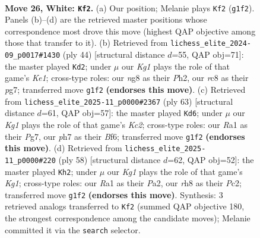\documentclass[11pt]{article}
\begin{document}
\clearpage

\begin{figure}[p]\centering
\begin{subfigure}{0.46\textwidth}\centering
\resizebox{\linewidth}{!}{%
\newchessgame
\chessboard[
  setfen={2r2knr/p6p/2p2bp1/8/4BB2/5P1P/PPP3P1/RR4K1 w - - 2 26},
  showmover=false,
  pgfstyle=straightmove, color=movearrow, markmove={g1-f2}
]}
\caption{}
\end{subfigure}\hfill
\begin{subfigure}{0.46\textwidth}\centering
\resizebox{\linewidth}{!}{%
\newchessgame
\chessboard[
  setfen={r1r5/pp3kpp/5p2/8/b1PB4/P3PP2/5P1P/2R1K2R w - - 3 23},
  showmover=false,
  pgfstyle=straightmove, color=movearrow, markmove={e1-d2}
]}
\caption{}
\end{subfigure}
\\[4pt]
\begin{subfigure}{0.46\textwidth}\centering
\resizebox{\linewidth}{!}{%
\newchessgame
\chessboard[
  setfen={r3r3/2k3p1/2p2b1p/p2pp3/N7/1PB5/P1P1R1KP/4R3 b - - 1 32},
  showmover=false,
  pgfstyle=straightmove, color=movearrow, markmove={c7-d6}
]}
\caption{}
\end{subfigure}\hfill
\begin{subfigure}{0.46\textwidth}\centering
\resizebox{\linewidth}{!}{%
\newchessgame
\chessboard[
  setfen={4r3/5k2/bp5p/p2r1pp1/8/2B4P/PPP2RP1/2R3K1 w - - 1 30},
  showmover=false,
  pgfstyle=straightmove, color=movearrow, markmove={g1-h2}
]}
\caption{}
\end{subfigure}
\caption{\textbf{Move 26, White: \texttt{Kf2}.} (a) Our position; Melanie plays \texttt{Kf2} (\texttt{g1f2}). Panels (b)--(d) are the retrieved master positions whose correspondence most drove this move (highest QAP objective among those that transfer to it). (b) Retrieved from \texttt{lichess\_elite\_2024-09\_p0017\#1430} (ply 44) [structural distance $d$=55, QAP obj=71]: the master played \texttt{Kd2}; under $\mu$ our \emph{Kg1} plays the role of that game's \emph{Ke1}; cross-type roles: our \emph{n}g8 as their \emph{P}h2, our \emph{r}c8 as their \emph{p}g7; transferred move \texttt{g1f2} \textbf{(endorses this move)}. (c) Retrieved from \texttt{lichess\_elite\_2025-11\_p0000\#2367} (ply 63) [structural distance $d$=61, QAP obj=57]: the master played \texttt{Kd6}; under $\mu$ our \emph{Kg1} plays the role of that game's \emph{Kc2}; cross-type roles: our \emph{R}a1 as their \emph{P}g7, our \emph{p}h7 as their \emph{B}f6; transferred move \texttt{g1f2} \textbf{(endorses this move)}. (d) Retrieved from \texttt{lichess\_elite\_2025-11\_p0000\#220} (ply 58) [structural distance $d$=62, QAP obj=52]: the master played \texttt{Kh2}; under $\mu$ our \emph{Kg1} plays the role of that game's \emph{Kg1}; cross-type roles: our \emph{R}a1 as their \emph{P}a2, our \emph{r}h8 as their \emph{P}c2; transferred move \texttt{g1f2} \textbf{(endorses this move)}. Synthesis: 3 retrieved analogs transferred to \texttt{Kf2} (summed QAP objective 180, the strongest correspondence among the candidate moves); Melanie committed it via the \texttt{search} selector.}
\label{fig:thought-m50}
\end{figure}
\end{document}
